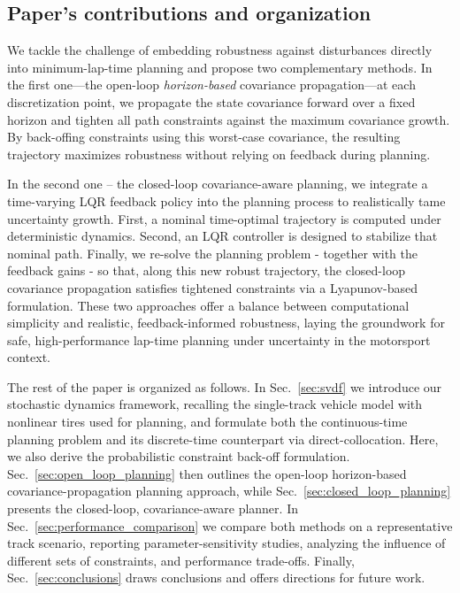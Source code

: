 \subsection{Paper's contributions and organization}
We tackle the challenge of embedding robustness against disturbances directly into minimum-lap-time planning and propose two complementary methods. In the first one---the open-loop \emph{horizon-based} covariance propagation---at each discretization point, we propagate the state covariance forward over a fixed horizon and tighten all path constraints against the maximum covariance growth. By back-offing constraints using this worst-case covariance, the resulting trajectory maximizes robustness without relying on feedback during planning.

In the second one -- the closed-loop covariance-aware planning, we integrate a time-varying LQR feedback policy into the planning process to realistically tame uncertainty growth. First, a nominal time-optimal trajectory is computed under deterministic dynamics. Second, an LQR controller is designed to stabilize that nominal path. Finally, we re-solve the planning problem - together with the feedback gains - so that, along this new robust trajectory, the closed-loop covariance propagation satisfies tightened constraints via a Lyapunov-based formulation. These two approaches offer a balance between computational simplicity and realistic, feedback-informed robustness, laying the groundwork for safe, high-performance lap-time planning under uncertainty in the motorsport context.

The rest of the paper is organized as follows.
In Sec.~\ref{sec:svdf} we introduce our stochastic dynamics framework, recalling the single-track vehicle model with nonlinear tires used for planning, and formulate both the continuous-time planning problem and its discrete-time counterpart via direct-collocation. Here, we also derive the probabilistic constraint back-off formulation.
Sec.~\ref{sec:open_loop_planning} then outlines the open-loop horizon-based covariance-propagation planning approach, while Sec.~\ref{sec:closed_loop_planning} presents the closed-loop, covariance-aware planner. In Sec.~\ref{sec:performance_comparison} we compare both methods on a representative track scenario, reporting parameter-sensitivity studies, analyzing the influence of different sets of constraints, and performance trade-offs.
Finally, Sec.~\ref{sec:conclusions} draws conclusions and offers directions for future work.
